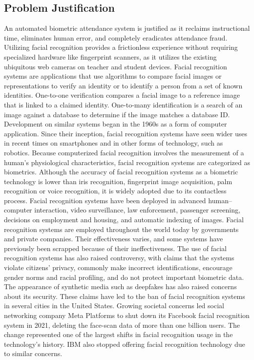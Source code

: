 \documentclass[12pt,a4paper]{report}
\begin{document}
\subsection{Problem Justification}
An automated biometric attendance system is justified as it reclaims instructional time, eliminates human error, and completely eradicates attendance fraud. Utilizing facial recognition provides a frictionless experience without requiring specialized hardware like fingerprint scanners, as it utilizes the existing ubiquitous web cameras on teacher and student devices.
Facial recognition systems are applications that use algorithms to compare facial images or representations to verify an identity or to identify a person from a set of known identities. One-to-one verification compares a facial image to a reference image that is linked to a claimed identity. One-to-many identification is a search of an image against a database to determine if the image matches a database ID.
Development on similar systems began in the 1960s as a form of computer application. Since their inception, facial recognition systems have seen wider uses in recent times on smartphones and in other forms of technology, such as robotics. Because computerized facial recognition involves the measurement of a human's physiological characteristics, facial recognition systems are categorized as biometrics. Although the accuracy of facial recognition systems as a biometric technology is lower than iris recognition, fingerprint image acquisition, palm recognition or voice recognition, it is widely adopted due to its contactless process. Facial recognition systems have been deployed in advanced human–computer interaction, video surveillance, law enforcement, passenger screening, decisions on employment and housing, and automatic indexing of images.
Facial recognition systems are employed throughout the world today by governments and private companies. Their effectiveness varies, and some systems have previously been scrapped because of their ineffectiveness. The use of facial recognition systems has also raised controversy, with claims that the systems violate citizens' privacy, commonly make incorrect identifications, encourage gender norms and racial profiling, and do not protect important biometric data. The appearance of synthetic media such as deepfakes has also raised concerns about its security. These claims have led to the ban of facial recognition systems in several cities in the United States. Growing societal concerns led social networking company Meta Platforms to shut down its Facebook facial recognition system in 2021, deleting the face-scan data of more than one billion users. The change represented one of the largest shifts in facial recognition usage in the technology's history. IBM also stopped offering facial recognition technology due to similar concerns.
\end{document}
